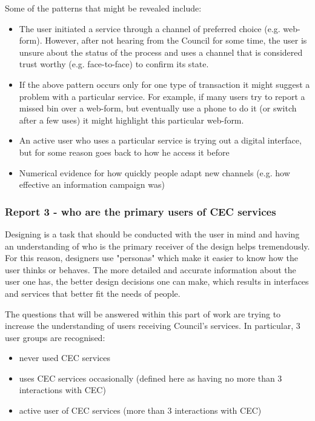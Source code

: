 Some of the patterns that might be revealed include:
\begin{itemize}
\item The user initiated a service through a channel of preferred choice (e.g. web-form). However, after not hearing from the Council for some time, the user is unsure about the status of the process and uses a channel that is considered trust worthy (e.g. face-to-face) to confirm its state.
\item If the above pattern occurs only for one type of transaction it might suggest a problem with a particular service. For example, if many users try to report a missed bin over a web-form, but eventually use a phone to do it (or switch after a few uses) it might highlight this particular web-form.
\item An active user who uses a particular service is trying out a digital interface, but for some reason goes back to how he access it before
\item Numerical evidence for how quickly people adapt new channels (e.g. how effective an information campaign was)
\end{itemize}	
			
			\subsubsection{Report 3 - who are the primary users of CEC services}
			
Designing is a task that should be conducted with the user in mind and having an understanding of who is the primary receiver of the design helps tremendously. For this reason, designers use "personas" which make it easier to know how the user thinks or behaves. The more detailed and accurate information about the user one has, the  better design decisions one can make, which results in interfaces and services that better fit the needs of people.

The questions that will be answered within this part of work are trying to increase the understanding of users receiving Council's services. In particular, 3 user groups are recognised:
\begin{itemize}
\item never used CEC services
\item uses CEC services occasionally (defined here as having no more than 3 interactions with CEC)
\item active user of CEC services (more than 3 interactions with CEC)
\end{itemize}

